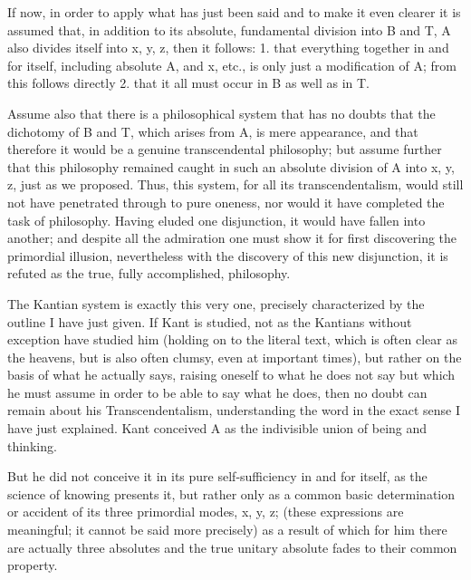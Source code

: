 If now, in order to apply what has just been said and
to make it even clearer it is assumed that,
in addition to its absolute, fundamental division into B and T,
A also divides itself into x, y, z, then it follows:
1. that everything together in and for itself,
including absolute A, and x, etc., is only just a modification of A;
from this follows directly
2. that it all must occur in B as well as in T.

Assume also that there is a philosophical system that has no doubts that
the dichotomy of B and T, which arises from A, is mere appearance, and
that therefore it would be a genuine transcendental philosophy;
but assume further that this philosophy remained caught in such
an absolute division of A into x, y, z, just as we proposed.
Thus, this system, for all its transcendentalism,
would still not have penetrated through to pure oneness,
nor would it have completed the task of philosophy.
Having eluded one disjunction, it would have fallen into another;
and despite all the admiration one must show it
for first discovering the primordial illusion,
nevertheless with the discovery of this new disjunction,
it is refuted as the true, fully accomplished, philosophy.

The Kantian system is exactly this very one,
precisely characterized by the outline I have just given.
If Kant is studied, not as the Kantians without exception have studied him
(holding on to the literal text, which is often clear
as the heavens, but is also often clumsy, even at important times),
but rather on the basis of what he actually says,
raising oneself to what he does not say
but which he must assume in order to be able to say what he does,
then no doubt can remain about his Transcendentalism,
understanding the word in the exact sense I have just explained.
Kant conceived A as the indivisible union of being and thinking.

But he did not conceive it in its pure self-sufficiency in and for itself,
as the science of knowing presents it, but rather only
as a common basic determination or accident of its
three primordial modes, x, y, z;
(these expressions are meaningful; it cannot be said more precisely)
as a result of which for him there are actually three absolutes and
the true unitary absolute fades to their common property.


